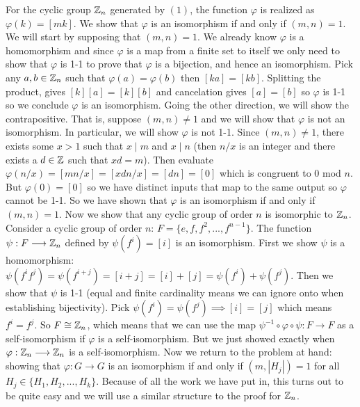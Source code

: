 \documentclass[11pt]{article}
\begin{document}
\begin{exercise}{74}{13}
{        For the cyclic group $\mathbb{Z} _n$ generated by $(1)$, the function $\varphi$ is realized as $\varphi (k) = [mk]$.
        We show that $\varphi$ is an isomorphism if and only if $(m, n) = 1$.
        We will start by supposing that $(m, n) = 1$.
        We already know $\varphi$ is a homomorphism and since $\varphi$ is a map from a finite set to itself we only need to show that $\varphi$ is 1-1 to prove that $\varphi$ is a bijection, and hence an isomorphism.
        Pick any $a, b \in \mathbb{Z}_n$ such that $\varphi (a) = \varphi (b)$ then $[ka] = [kb]$.
        Splitting the product, gives $[k] [a] = [k] [b]$ and cancelation gives $[a] = [b]$ so $\varphi$ is 1-1 so we conclude $\varphi$ is an isomorphism. \parspace 
        Going the other direction, we will show the contrapositive.
        That is, suppose $(m, n) \neq 1$ and we will show that $\varphi$ is not an isomorphism.
        In particular, we will show $\varphi$ is not 1-1.
        Since $(m, n) \neq 1$, there exists some $x > 1$ such that $x \mid m$ and $x \mid n$ (then $n/x$ is an integer and there exists a $d \in \mathbb{Z}$ such that $xd = m$).
        Then evaluate $\varphi (n/x) = [m n/x] = [xd n/x] = [dn] = [0]$ which is congruent to 0 mod $n$.
        But $\varphi (0) = [0]$ so we have distinct inputs that map to the same output so $\varphi$ cannot be 1-1.
        So we have shown that $\varphi$ is an isomorphism if and only if $(m, n) = 1$. \parspace 
        Now we show that any cyclic group of order $n$ is isomorphic to $\mathbb{Z} _n$.
        Consider a cyclic group of order $n$: $F = \{ e, f, f^2, ..., f^{n-1} \}$.
        The function $\psi : F \longrightarrow \mathbb{Z} _n$ defined by $\psi (f^i) = [i]$ is an isomorphism.
        First we show $\psi$ is a homomorphism: $\psi (f^i f^j) = \psi (f^{i+j}) = [i+j] = [i] + [j] = \psi (f^i) + \psi (f^j)$.
        Then we show that $\psi$ is 1-1 (equal and finite cardinality means we can ignore onto when establishing bijectivity).
        Pick $\psi (f^i) = \psi (f^j) \implies [i] = [j]$ which means $f^i = f^j$.
        So $F \cong \mathbb{Z}_n$, which means that we can use the map $\psi ^{-1} \circ \varphi \circ \psi : F \to F$ as a self-isomorphism if $\varphi$ is a self-isomorphism. 
        But we just showed exactly when $\varphi : \mathbb{Z}_n \longrightarrow \mathbb{Z} _n$ is a self-isomorphism. \parspace 
        Now we return to the problem at hand: showing that $\varphi : G \to G$ is an isomorphism if and only if $(m, |H_j|) = 1$ for all $H_j \in \{ H_1, H_2, ..., H_k \}$.
        Because of all the work we have put in, this turns out to be quite easy and we will use a similar structure to the proof for $\mathbb{Z} _n$.
}
\end{exercise}
\end{document}

